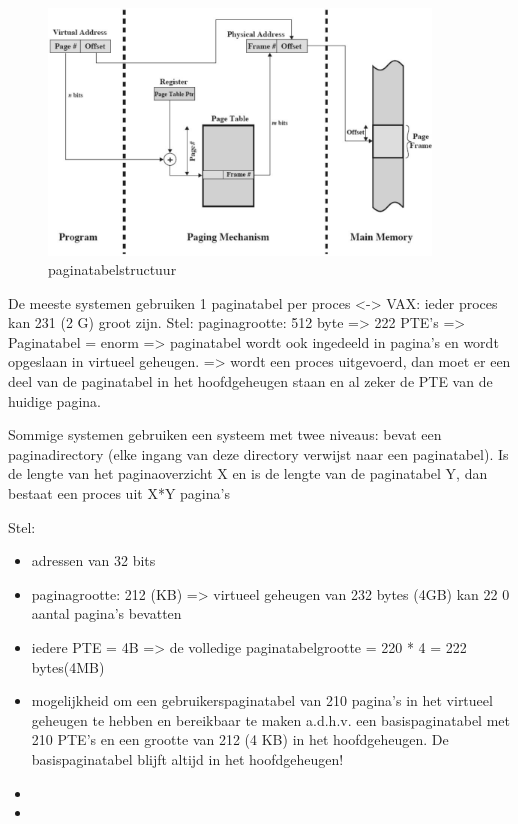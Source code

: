\begin{figure}[htp]
    \centering
            \includegraphics[width=4in]{img/paginatabelstructuur.jpg}
        \caption{paginatabelstructuur}
    \label{fig:paginatabelstructuur}
\end{figure}

De meeste systemen gebruiken 1 paginatabel per proces <-> VAX: ieder proces kan 231 (2 G) groot zijn. Stel: paginagrootte: 512 byte => 222 PTE's => Paginatabel = enorm => paginatabel wordt ook ingedeeld in pagina's en wordt opgeslaan in virtueel geheugen. => wordt een proces uitgevoerd, dan moet er een deel van de paginatabel in het hoofdgeheugen staan en al zeker de PTE van de huidige pagina.

Sommige systemen gebruiken een systeem met twee niveaus: bevat een paginadirectory (elke ingang van deze directory verwijst naar een paginatabel). Is de lengte van het paginaoverzicht X en is de lengte van de paginatabel Y, dan bestaat een proces uit X*Y pagina's

Stel:

\begin{itemize}
\item adressen van 32 bits
\item paginagrootte: 212 (KB) => virtueel geheugen van 232 bytes (4GB) kan 22 0 aantal pagina’s bevatten
\item iedere PTE = 4B => de volledige paginatabelgrootte = 220 * 4 = 222 bytes(4MB)
\item mogelijkheid om een gebruikerspaginatabel van 210 pagina's in het virtueel geheugen te hebben en bereikbaar te maken a.d.h.v. een basispaginatabel met 210 PTE's en een grootte van 212 (4 KB) in het hoofdgeheugen. De basispaginatabel blijft altijd in het hoofdgeheugen!
\item 
\item 
\end{itemize}


